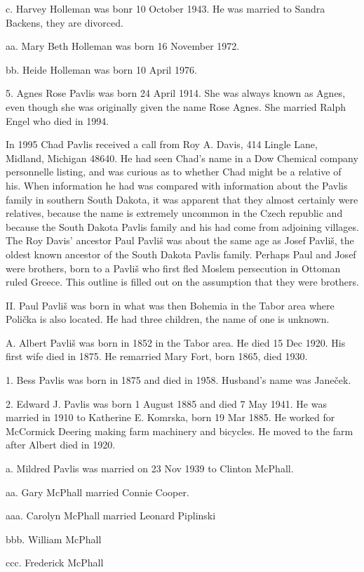 \documentclass[a4paper]{article}
\begin{document}
c. Harvey Holleman was bonr 10 October 1943.  He was married to Sandra Backens, they are divorced.

aa. Mary Beth Holleman was born 16 November 1972.

bb. Heide Holleman was born 10 April 1976.

5. Agnes Rose Pavlis was born 24 April 1914.  She was always known as Agnes, even though she was originally given the name Rose Agnes.  She married Ralph Engel who died in 1994.

	In 1995 Chad Pavlis received a call from Roy A. Davis, 414 Lingle Lane, Midland, Michigan 48640.  He had seen Chad's name in a Dow Chemical company personnelle listing, and was curious as to whether Chad might be a relative of his.  When information he had was compared with information about the Pavlis family in southern South Dakota, it was apparent that they almost certainly were relatives, because the name is extremely uncommon in the Czech republic and because the South Dakota Pavlis family and his had come from adjoining villages.  
	The  Roy Davis' ancestor Paul Pavliš was about the same age as Josef Pavliš, the oldest known ancestor of the South Dakota Pavlis family.   Perhaps Paul and Josef were brothers, born to a Pavliš who first fled Moslem persecution in Ottoman ruled Greece.  This outline is filled out on the  assumption that they were brothers. 

II. Paul Pavliš was born in what was then Bohemia in the Tabor area where Polička is also located.  He had three children, the name of one is unknown.

A. Albert Pavliš was born in 1852 in the Tabor area.  He died 15 Dec 1920.  His first wife died in 1875.  He remarried Mary Fort, born 1865, died 1930.  

1. Bess Pavlis was born in 1875 and died in 1958.  Husband's name was Janeček.

2. Edward J. Pavlis was born 1 August 1885 and died 7 May 1941.  He was married in 1910 to Katherine E. Komrska, born 19 Mar 1885.  He worked for McCormick Deering making farm machinery and bicycles.  He moved to the farm after Albert died in 1920.  

a. Mildred Pavlis was married on 23 Nov 1939 to Clinton McPhall.

aa. Gary McPhall married Connie Cooper.

aaa. Carolyn McPhall married Leonard Piplinski
		
bbb. William McPhall 

ccc. Frederick McPhall
\end{document}
